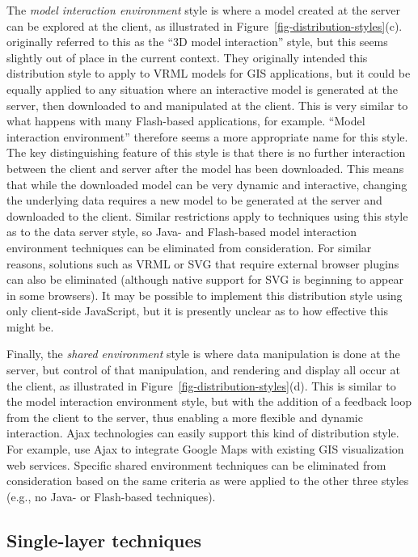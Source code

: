 \documentclass[acmnow]{acmtrans2m}
\begin{document}
The \emph{model interaction environment} style is where a model created
at the server can be explored at the client, as illustrated in
Figure~\ref{fig-distribution-styles}(c). 
originally referred to this as the ``3D model interaction'' style, but
this seems slightly out of place in the current context. They originally
intended this distribution style to apply to VRML models for GIS
applications, but it could be equally applied to any situation where an
interactive model is generated at the server, then downloaded to and
manipulated at the client. This is very similar to what happens with
many Flash-based applications, for example. ``Model interaction
environment'' therefore seems a more appropriate name for this style.
The key distinguishing feature of this style is that there is no further
interaction between the client and server after the model has been
downloaded. This means that while the downloaded model can be very
dynamic and interactive, changing the underlying data requires a new
model to be generated at the server and downloaded to the client.
Similar restrictions apply to techniques using this style as to the data
server style, so Java- and Flash-based model interaction environment
techniques can be eliminated from consideration. For similar reasons,
solutions such as VRML or SVG that require external browser plugins can
also be eliminated (although native support for SVG is beginning to
appear in some browsers). It may be possible to implement this
distribution style using only client-side JavaScript, but it is
presently unclear as to how effective this might be.

Finally, the \emph{shared environment} style is where data manipulation
is done at the server, but control of that manipulation, and rendering
and display all occur at the client, as illustrated in
Figure~\ref{fig-distribution-styles}(d). This is similar to the model
interaction environment style, but with the addition of a feedback loop
from the client to the server, thus enabling a more flexible and dynamic
interaction. Ajax technologies \cite{Garr-JJ-2005-Ajax} can easily
support this kind of distribution style. For example,
 use Ajax to integrate Google Maps with
existing GIS visualization web services. Specific shared environment
techniques can be eliminated from consideration based on the same
criteria as were applied to the other three styles (e.g., no Java- or
Flash-based techniques).


\subsection{Single-layer techniques}
\label{sec-image-gen}
\end{document}
